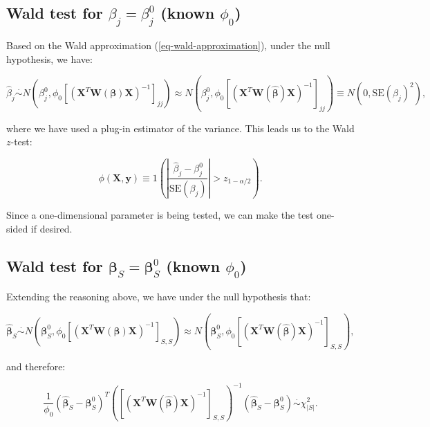 \documentclass[
  11pt,
  letterpaper,
  oneside]{book}
\theoremstyle{definition}
\theoremstyle{plain}
\theoremstyle{plain}
\theoremstyle{plain}
\theoremstyle{remark}
\begin{document}
\hypertarget{sec-wald-test-single-coeff}{%
\subsection{\texorpdfstring{Wald test for \(\beta_j = \beta_j^0\) (known
\(\phi_0\))}{Wald test for \textbackslash beta\_j = \textbackslash beta\_j\^{}0 (known \textbackslash phi\_0)}}\label{sec-wald-test-single-coeff}}

Based on the Wald approximation (\ref{eq-wald-approximation}), under the
null hypothesis, we have:

\[
\widehat \beta_j \overset{\cdot}{\sim} N(\beta_j^0, \phi_0[(\boldsymbol{X}^T \boldsymbol{W}(\boldsymbol{\beta}) \boldsymbol{X})^{-1}]_{jj}) \approx N(\beta_j^0, \phi_0[(\boldsymbol{X}^T \boldsymbol{W}(\boldsymbol{\widehat \beta}) \boldsymbol{X})^{-1}]_{jj}) \equiv N(0, \text{SE}(\beta_j)^2),
\]

where we have used a plug-in estimator of the variance. This leads us to
the Wald \(z\)-test:

\[
\phi(\boldsymbol{X}, \boldsymbol{y}) \equiv 1\left(\left|\frac{\widehat \beta_j - \beta_j^0}{\text{SE}(\beta_j)}\right| > z_{1-\alpha/2}\right).
\]

Since a one-dimensional parameter is being tested, we can make the test
one-sided if desired.

\hypertarget{sec-wald-test-group-coeff}{%
\subsection{\texorpdfstring{Wald test for
\(\boldsymbol{\beta}_S = \boldsymbol{\beta}_S^0\) (known
\(\phi_0\))}{Wald test for \textbackslash boldsymbol\{\textbackslash beta\}\_S = \textbackslash boldsymbol\{\textbackslash beta\}\_S\^{}0 (known \textbackslash phi\_0)}}\label{sec-wald-test-group-coeff}}

Extending the reasoning above, we have under the null hypothesis that:

\[
\boldsymbol{\widehat \beta}_S \overset{\cdot}{\sim} N(\boldsymbol{\beta}_S^0, \phi_0[(\boldsymbol{X}^T \boldsymbol{W}(\boldsymbol{\beta}) \boldsymbol{X})^{-1}]_{S,S}) \approx N(\boldsymbol{\beta}_S^0, \phi_0[(\boldsymbol{X}^T \boldsymbol{W}(\boldsymbol{\widehat \beta}) \boldsymbol{X})^{-1}]_{S,S}),
\]

and therefore:

\[
\frac{1}{\phi_0} (\boldsymbol{\widehat \beta}_S - \boldsymbol{\beta}_S^0)^T \left([(\boldsymbol{X}^T \boldsymbol{W}(\boldsymbol{\widehat \beta}) \boldsymbol{X})^{-1}]_{S,S}\right)^{-1}(\boldsymbol{\widehat \beta}_S - \boldsymbol{\beta}_S^0) \overset{\cdot}{\sim} \chi^2_{|S|}.
\]
\end{document}
